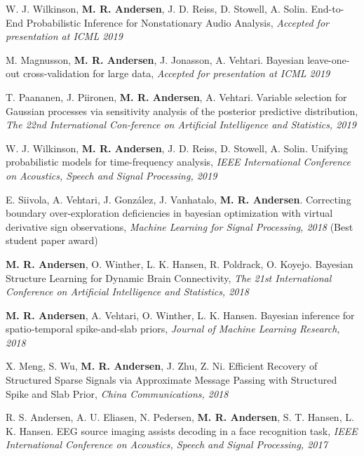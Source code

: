 \documentclass[10pt]{article}
\begin{document}
\begin{bibenum}

\item W. J. Wilkinson, \textbf{M. R. Andersen}, J. D. Reiss, D. Stowell, A. Solin. End-to-End Probabilistic Inference for Nonstationary Audio Analysis, \textit{Accepted for presentation at ICML 2019}


\item M. Magnusson, \textbf{M. R. Andersen}, J. Jonasson, A. Vehtari. Bayesian leave-one-out cross-validation for large data, \textit{Accepted for presentation at ICML 2019}



\item T. Paananen, J. Piironen, \textbf{M. R. Andersen}, A. Vehtari. Variable selection for Gaussian processes via sensitivity analysis of the posterior predictive distribution, \textit{The 22nd International Con-ference on 
Artificial Intelligence and Statistics, 2019}

\item W. J. Wilkinson, \textbf{M. R. Andersen}, J. D. Reiss, D. Stowell, A. Solin. Unifying probabilistic models for time-frequency analysis, \textit{IEEE International Conference on Acoustics, Speech and Signal Processing, 2019}

\item E. Siivola, A. Vehtari, J. Gonz\'alez, J. Vanhatalo, \textbf{M. R. Andersen}. Correcting boundary over-exploration deficiencies in bayesian optimization with virtual derivative sign observations,  \textit{Machine Learning for Signal Processing, 2018} (Best student paper award)

\item \textbf{M. R. Andersen}, O. Winther, L. K. Hansen, R. Poldrack, O. Koyejo. Bayesian Structure Learning for Dynamic Brain Connectivity, \textit{The 21st International Conference on 
Artificial Intelligence and Statistics, 2018}

\item \textbf{M. R. Andersen}, A. Vehtari, O. Winther, L. K. Hansen. Bayesian inference for spatio-temporal spike-and-slab priors, \textit{Journal of Machine Learning Research, 2018}

\item X. Meng, S. Wu, \textbf{M. R. Andersen}, J. Zhu, Z. Ni. Efficient Recovery of Structured Sparse Signals via Approximate Message Passing with Structured Spike and Slab Prior, \textit{China Communications, 2018}


\item R. S. Andersen, A. U. Eliasen, N. Pedersen, \textbf{M. R. Andersen}, S. T. Hansen, L. K. Hansen. EEG source imaging assists decoding in a face recognition task, \textit{IEEE International Conference on Acoustics, Speech and Signal Processing, 2017}


\end{bibenum}
\end{document}
